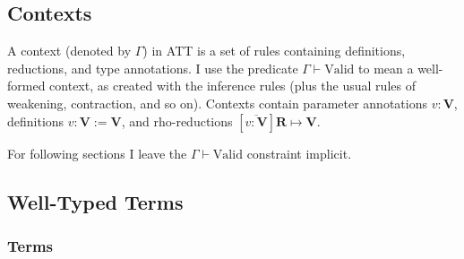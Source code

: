 \documentclass{article}
\newcommand{\bb}{\mathbf}
\newcommand{\evals}{\rightsquigarrow^{nf}}
\begin{document}
\subsection{Contexts}

A context (denoted by $\Gamma$) in ATT is a set of rules containing definitions, reductions, and type annotations. I use the predicate $\Gamma \vdash \mathrm{Valid}$ to mean a well-formed context, as created with the inference rules (plus the usual rules of weakening, contraction, and so on). Contexts contain parameter annotations $v : \bb{V}$, definitions $v : \bb{V} := \bb{V}$, and rho-reductions $[\overline{v : \bb{V}}] \bb{R} \mapsto \bb{V}$.


For following sections I leave the $\Gamma \vdash \mathrm{Valid}$ constraint implicit.

\subsection{Well-Typed Terms}

\subsubsection{Terms}
\end{document}
